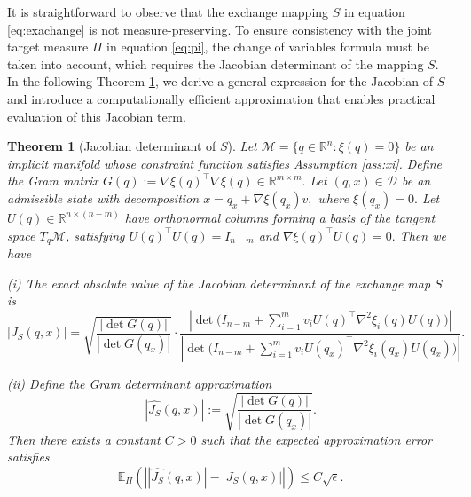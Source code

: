\documentclass[12pt]{article}
\newtheorem{theorem}{Theorem}[section]
\begin{document}
It is straightforward to observe that the exchange mapping $S$ in equation \eqref{eq:exachange} is not measure-preserving. To ensure consistency with the joint target measure $\Pi$ in equation \eqref{eq:pi}, the change of variables formula must be taken into account, which requires the Jacobian determinant of the mapping $S$. In the following Theorem \ref{thm:jacobian_gram}, we derive a general expression for the Jacobian of $S$ and introduce a computationally efficient approximation that enables practical evaluation of this Jacobian term.
\begin{theorem}[Jacobian determinant of $S$]
\label{thm:jacobian_gram}
Let 
\(
\mathcal M = \{q\in\mathbb R^n : \xi(q)=0\}
\)
be an implicit manifold whose constraint function satisfies Assumption \ref{ass:xi}. Define the Gram matrix
\(
G(q) := \nabla\xi(q)^\top \nabla\xi(q) \in \mathbb{R}^{m\times m}.
\)
Let $(q,x)\in\mathcal D$ be an admissible state with decomposition
\(
x = q_x + \nabla\xi(q_x)v,
\)
where
\(
\xi(q_x)=0.
\)
Let $U(q)\in\mathbb{R}^{n\times (n-m)}$ have orthonormal columns forming a basis of the tangent space $T_q\mathcal M$, satisfying
\(
U(q)^\top U(q)=I_{n-m}
\)
and
\(
\nabla\xi(q)^\top U(q)=0.
\) Then we have

\textnormal{(i)} The exact absolute value of the Jacobian determinant of the exchange map $S$ is
\begin{equation}\label{eq:jaco}
|J_S(q,x)| = \sqrt{\frac{|\det G(q)|}{|\det G(q_x)|}}
\cdot
\frac{
\left|\det\Big(I_{n-m} + \sum_{i=1}^m v_i U(q)^\top \nabla^2\xi_i(q) U(q)\Big)\right|
}{
\left|\det\Big(I_{n-m} + \sum_{i=1}^m v_i U(q_x)^\top \nabla^2\xi_i(q_x) U(q_x)\Big)\right|}.
\end{equation}

\textnormal{(ii)} Define the Gram determinant approximation
\begin{equation}\label{eq:appro}
|\widehat{J_S}(q,x)| :=
\sqrt{\frac{|\det G(q)|}{|\det G(q_x)|}}.
\end{equation}
Then there exists a constant $C>0$ such that the expected approximation error satisfies
\begin{equation}\label{eq:error}
\mathbb{E}_{\Pi}
\!\left(
\left\vert
|\widehat{J_S}(q,x)|
-
|J_S(q,x)|
\right\vert
\right)
\le C\sqrt{\epsilon}.
\end{equation}

\end{theorem}
\end{document}

